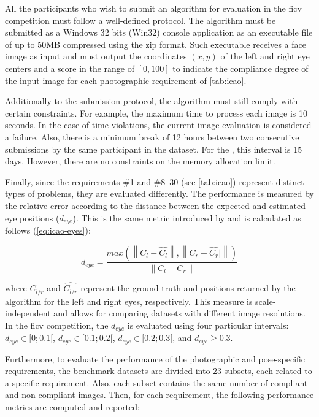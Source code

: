 All the participants who wish to submit an algorithm for evaluation in the \acs{ficv} competition must follow a well-defined protocol. The algorithm must be submitted as a Windows 32 bits (Win32) console application as an executable file of up to 50MB compressed using the zip format. Such executable receives a face image as input and must output the coordinates $(x, y)$ of the left and right eye centers and a score in the range of $[0, 100]$ to indicate the compliance degree of the input image for each photographic requirement of \autoref{tab:icao}.

Additionally to the submission protocol, the algorithm must still comply with certain constraints. For example, the maximum time to process each image is 10 seconds. In the case of time violations, the current image evaluation is considered a failure. Also, there is a minimum break of 12 hours between two consecutive submissions by the same participant in the \ficvtest dataset. For the \ficvofficial, this interval is 15 days. However, there are no constraints on the memory allocation limit.

Finally, since the requirements \#1 and \#8--30 (see \autoref{tab:icao}) represent distinct types of problems, they are evaluated differently. The \eyecenterlocation performance is measured by the relative error according to the distance between the expected and estimated eye positions ($d_{eye}$). This is the same metric introduced by \cite{jesorsky2001robust} and is calculated as follows (\autoref{eq:icao-eyes}):

\begin{equation}
\label{eq:icao-eyes}
d_{eye} = \frac{max(\left\| C_l - \hat{C_l} \right\|, \left\| C_r -\hat{C_r}|\right\|)}{\left\| C_l - C_r \right\|}
\end{equation}

\noindent
where $C_{l/r}$ and $\hat{C_{l/r}}$ represent the ground truth and positions returned by the algorithm for the left and right eyes, respectively. This measure is scale-independent and allows for comparing datasets with different image resolutions. In the \acs{ficv} competition, the $d_{eye}$ is evaluated using four particular intervals: $d_{eye} \in [0;0.1[$, $d_{eye} \in [0.1;0.2[$, $d_{eye} \in [0.2;0.3[$, and $d_{eye} \geq 0.3$.

Furthermore, to evaluate the performance of the photographic and pose-specific requirements, the benchmark datasets are divided into 23 subsets, each related to a specific requirement. Also, each subset contains the same number of compliant and non-compliant images. Then, for each requirement, the following performance metrics are computed and reported:

